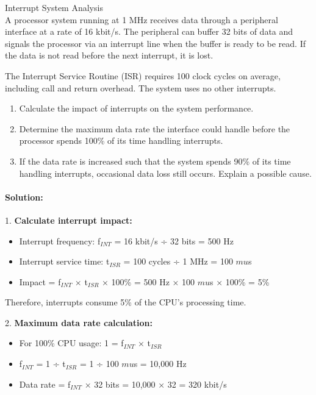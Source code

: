 \begin{example2}{Interrupt System Analysis}\\
A processor system running at 1 MHz receives data through a peripheral interface at a rate of 16 kbit/s. The peripheral can buffer 32 bits of data and signals the processor via an interrupt line when the buffer is ready to be read. If the data is not read before the next interrupt, it is lost.

The Interrupt Service Routine (ISR) requires 100 clock cycles on average, including call and return overhead. The system uses no other interrupts.

\begin{enumerate}
    \item Calculate the impact of interrupts on the system performance.
    \item Determine the maximum data rate the interface could handle before the processor spends 100\% of its time handling interrupts.
    \item If the data rate is increased such that the system spends 90\% of its time handling interrupts, occasional data loss still occurs. Explain a possible cause.
\end{enumerate}

\tcblower
\paragraph{Solution:}

1. \textbf{Calculate interrupt impact:}
   \begin{itemize}
     \item Interrupt frequency: f$_{INT}$ = 16 kbit/s ÷ 32 bits = 500 Hz
     \item Interrupt service time: t$_{ISR}$ = 100 cycles ÷ 1 MHz = 100 $mu$s
     \item Impact = f$_{INT}$ × t$_{ISR}$ × 100\% = 500 Hz × 100 $mu$s × 100\% = 5\%
   \end{itemize}
   Therefore, interrupts consume 5\% of the CPU's processing time.

2. \textbf{Maximum data rate calculation:}
   \begin{itemize}
     \item For 100\% CPU usage: 1 = f$_{INT}$ × t$_{ISR}$
     \item f$_{INT}$ = 1 ÷ t$_{ISR}$ = 1 ÷ 100 $mu$s = 10,000 Hz
     \item Data rate = f$_{INT}$ × 32 bits = 10,000 × 32 = 320 kbit/s
   \end{itemize}


\end{example2}
